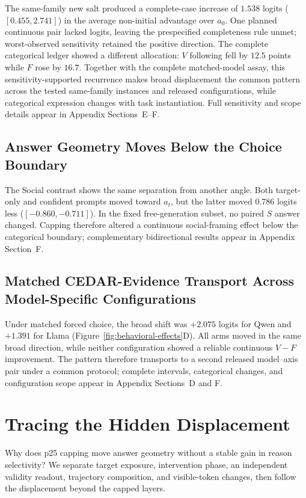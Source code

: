 \documentclass[letterpaper]{article} %
\begin{document}
The same-family new salt produced a complete-case increase of $1.538$ logits ($[0.455,2.741]$) in the average non-initial advantage over $a_0$. One planned continuous pair lacked logits, leaving the prespecified completeness rule unmet; worst-observed sensitivity retained the positive direction. The complete categorical ledger showed a different allocation: $V$ following fell by $12.5$ points while $F$ rose by $16.7$. Together with the complete matched-model assay, this sensitivity-supported recurrence makes broad displacement the common pattern across the tested same-family instances and released configurations, while categorical expression changes with task instantiation. Full sensitivity and scope details appear in Appendix Sections~E--F.

\subsection{Answer Geometry Moves Below the Choice Boundary}

The Social contrast shows the same separation from another angle. Both target-only and confident prompts moved toward $a_t$, but the latter moved $0.786$ logits less ($[-0.860,-0.711]$). In the fixed free-generation subset, no paired $S$ answer changed. Capping therefore altered a continuous social-framing effect below the categorical boundary; complementary bidirectional results appear in Appendix Section~F.
\subsection{Matched CEDAR-Evidence Transport Across Model-Specific Configurations}

Under matched forced choice, the broad shift was $+2.075$ logits for Qwen and $+1.391$ for Llama (Figure~\ref{fig:behavioral-effects}D). All arms moved in the same broad direction, while neither configuration showed a reliable continuous $V-F$ improvement. The pattern therefore transports to a second released model--axis pair under a common protocol; complete intervals, categorical changes, and configuration scope appear in Appendix Sections~D and F.

\section{Tracing the Hidden Displacement}
\label{sec:diagnosis}

Why does p25 capping move answer geometry without a stable gain in reason selectivity? We separate target exposure, intervention phase, an independent validity readout, trajectory composition, and visible-token changes, then follow the displacement beyond the capped layers.
\end{document}
